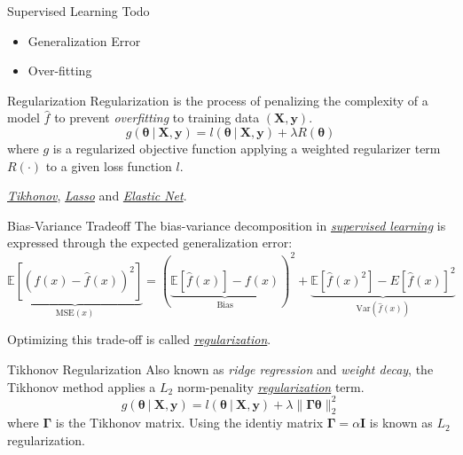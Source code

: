 \documentclass{cognito}
\begin{document}
\begin{draft}{Supervised Learning Todo}
	\begin{itemize}
		\item Generalization Error
		\item Over-fitting
	\end{itemize}
\end{draft}

\begin{note}{Regularization}
	Regularization is the process of penalizing the complexity of a model $\hat f$ to prevent \emph{overfitting} to training data $(\bm X, \bm y)$.
	$$ g(\bm \theta \:\vert\: \bm X, \bm y) = l(\bm \theta \:\vert\: \bm X, \bm y ) + \lambda R(\bm \theta)$$
	where $g$ is a regularized objective function applying a weighted regularizer term $R(\cdot)$ to a given loss function $l$.
	\begin{example}
		\hyperref[note:Tikhonov Regularization]{\it Tikhonov}, 
		\hyperref[note:Lasso Regularization]{\it Lasso} and
		\hyperref[note:Elastic Net Regularization]{\it Elastic Net}.
	\end{example}
	\vspace{-5pt}
\end{note}

\begin{note}{Bias-Variance Tradeoff}
	The bias-variance decomposition in \hyperref[note:Supervised Learning]{\it supervised learning}
	is expressed through the expected generalization error:
	$$
		\underbrace{\mathds{E}[(f(x) - \hat{f}(x))^2]}_{\text{MSE}(x)} = (\underbrace{\mathds{E}[\hat{f}(x)] - f(x)}_{\text{Bias}})^2
		+ \underbrace{\mathds{E}[\hat{f}(x)^2] - E[\hat{f}(x)]^2}_{\text{Var}(\hat{f}(x))}
	$$
	\begin{remark} Optimizing this trade-off is called \hyperref[note:Regularization]{\it regularization}.
	\end{remark}
	\vspace{-5pt}
\end{note}

\begin{note}{Tikhonov Regularization}
	Also known as \emph{ridge regression} and \emph{weight decay},
	the Tikhonov method applies a $L_2$ norm-penality \hyperref[note:Regularization]{\it regularization} term.
	$$
		 g(\bm \theta \:\vert\: \bm X, \bm y) = l(\bm \theta \:\vert\: \bm X, \bm y ) + \lambda \| \bm \Gamma \bm \theta \|_2^2
	$$
	where $\bm \Gamma$ is the Tikhonov matrix. Using the identiy matrix $\bm \Gamma = \alpha \bm I$ is
	known as $L_2$ regularization.
	
\end{note}
\end{document}
